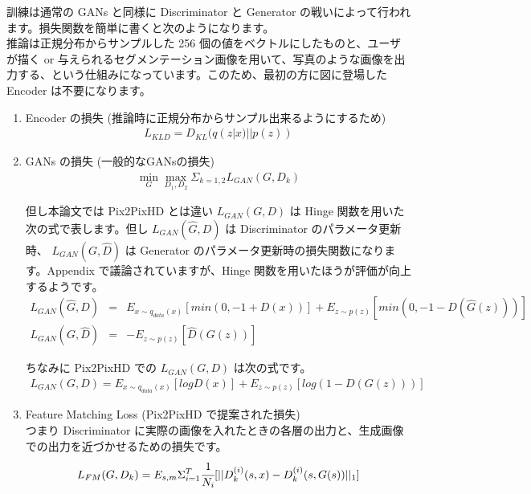 \documentclass[a4paper, dvipdfmx, 10pt]{article}
\begin{document}
訓練は通常の GANs と同様に Discriminator と Generator の戦いによって行われます。損失関数を簡単に書くと次のようになります。\\

推論は正規分布からサンプルした 256 個の値をベクトルにしたものと、ユーザが描く or 与えられるセグメンテーション画像を用いて、写真のような画像を出力する、という仕組みになっています。このため、最初の方に図に登場した Encoder は不要になります。\\

\begin{enumerate}
\item Encoder の損失 (推論時に正規分布からサンプル出来るようにするため)\\
\begin{eqnarray*}
L_{KLD} = D_{KL} (q(z|x) || p(z))
\end{eqnarray*}

\item GANs  の損失 (一般的なGANsの損失)\\
\begin{eqnarray*}
\min_{G} \max_{D_1, D_2} \Sigma_{k=1,2} L_{GAN}(G, D_k)
\end{eqnarray*}

但し本論文では Pix2PixHD とは違い \(L_{GAN}(G, D)\) は Hinge 関数を用いた 次の式で表します。但し \(L_{GAN}(\hat{G}, D)\) は Discriminator のパラメータ更新時、 \(L_{GAN}(G, \hat{D})\) は Generator のパラメータ更新時の損失関数になります。Appendix で議論されていますが、Hinge 関数を用いたほうが評価が向上するようです。\\

\begin{eqnarray*}
L_{GAN}(\hat{G}, D) &=& E_{x\sim q_{data}(x)} [min(0, -1 + D(x))] + E_{z \sim p(z)} [min (0, -1 - D(\hat{G}(z)))] \\
L_{GAN}(G, \hat{D}) &=& - E_{z\sim p(z)} [\hat{D}(G(z))]
\end{eqnarray*}

ちなみに Pix2PixHD での \(L_{GAN}(G, D)\) は次の式です。\\

\begin{eqnarray*}
L_{GAN}(G, D) = E_{x\sim q_{data}(x)} [logD(x)] + E_{z\sim p(z)} [log(1 -D(G(z)))]
\end{eqnarray*}

\item Feature Matching Loss (Pix2PixHD で提案された損失)\\
つまり Discriminator に実際の画像を入れたときの各層の出力と、生成画像での出力を近づかせるための損失です。\\
\begin{eqnarray*}
L_{FM}(G, D_k) = E_{s, m} \Sigma^T_{i=1} \cfrac{1}{N_i} [||D^{(i)}_k(s, x) -  D^{(i)}_k(s, G(s))||_1]
\end{eqnarray*}


\end{enumerate}
\end{document}
